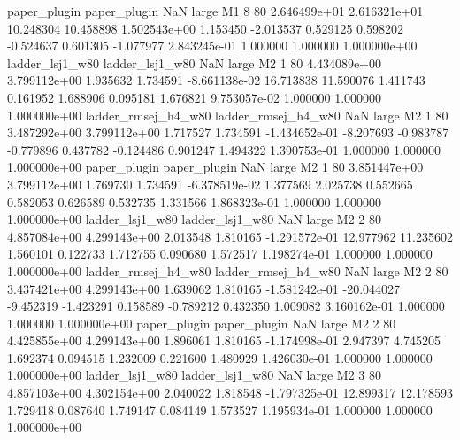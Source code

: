        paper_plugin        paper_plugin                   NaN      large       M1                 8 80 2.646499e+01   2.616321e+01     10.248304      10.458898  1.502543e+00      1.153450     -2.013537     0.529125       0.598202 -0.524637   0.601305    -1.077977   2.843245e-01            1.000000        1.000000        1.000000e+00
    ladder_lsj1_w80     ladder_lsj1_w80                   NaN      large       M2                 1 80 4.434089e+00   3.799112e+00      1.935632       1.734591 -8.661138e-02     16.713838     11.590076     1.411743       0.161952  1.688906   0.095181     1.676821   9.753057e-02            1.000000        1.000000        1.000000e+00
ladder_rmsej_h4_w80 ladder_rmsej_h4_w80                   NaN      large       M2                 1 80 3.487292e+00   3.799112e+00      1.717527       1.734591 -1.434652e-01     -8.207693     -0.983787    -0.779896       0.437782 -0.124486   0.901247     1.494322   1.390753e-01            1.000000        1.000000        1.000000e+00
       paper_plugin        paper_plugin                   NaN      large       M2                 1 80 3.851447e+00   3.799112e+00      1.769730       1.734591 -6.378519e-02      1.377569      2.025738     0.552665       0.582053  0.626589   0.532735     1.331566   1.868323e-01            1.000000        1.000000        1.000000e+00
    ladder_lsj1_w80     ladder_lsj1_w80                   NaN      large       M2                 2 80 4.857084e+00   4.299143e+00      2.013548       1.810165 -1.291572e-01     12.977962     11.235602     1.560101       0.122733  1.712755   0.090680     1.572517   1.198274e-01            1.000000        1.000000        1.000000e+00
ladder_rmsej_h4_w80 ladder_rmsej_h4_w80                   NaN      large       M2                 2 80 3.437421e+00   4.299143e+00      1.639062       1.810165 -1.581242e-01    -20.044027     -9.452319    -1.423291       0.158589 -0.789212   0.432350     1.009082   3.160162e-01            1.000000        1.000000        1.000000e+00
       paper_plugin        paper_plugin                   NaN      large       M2                 2 80 4.425855e+00   4.299143e+00      1.896061       1.810165 -1.174998e-01      2.947397      4.745205     1.692374       0.094515  1.232009   0.221600     1.480929   1.426030e-01            1.000000        1.000000        1.000000e+00
    ladder_lsj1_w80     ladder_lsj1_w80                   NaN      large       M2                 3 80 4.857103e+00   4.302154e+00      2.040022       1.818548 -1.797325e-01     12.899317     12.178593     1.729418       0.087640  1.749147   0.084149     1.573527   1.195934e-01            1.000000        1.000000        1.000000e+00
